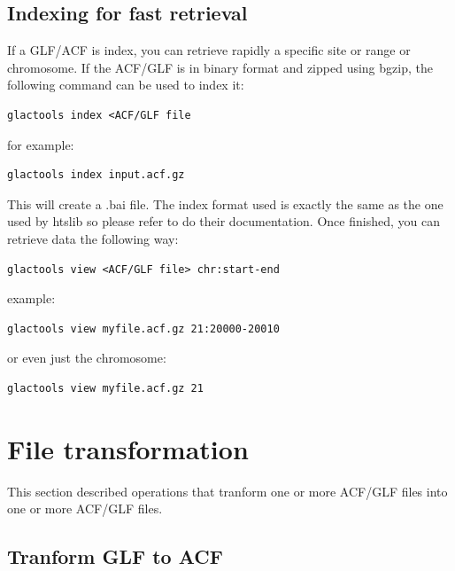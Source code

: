 \documentclass[a4paper]{article}
\begin{document}
\subsection{Indexing for fast retrieval}
\label{sec:indexing}
If a GLF/ACF is index, you can retrieve rapidly a specific site or range or chromosome. If the ACF/GLF is in binary format and zipped using bgzip, the following command can be used to index it:





\begin{lstlisting}
glactools index <ACF/GLF file
\end{lstlisting}

for example:
\begin{lstlisting}
glactools index input.acf.gz
\end{lstlisting}

This will create a .bai file. The index format used is exactly the same as the one used by htslib so please refer to do their documentation. Once finished, you can retrieve data the following way:

\begin{lstlisting}
glactools view <ACF/GLF file> chr:start-end
\end{lstlisting}

example:
\begin{lstlisting}
glactools view myfile.acf.gz 21:20000-20010
\end{lstlisting}
or even just the chromosome:

\begin{lstlisting}
glactools view myfile.acf.gz 21
\end{lstlisting}

\newpage

\section{File transformation}

This section described operations that tranform one or more ACF/GLF files into one or more ACF/GLF files.

\subsection{Tranform GLF to ACF}
\end{document}
